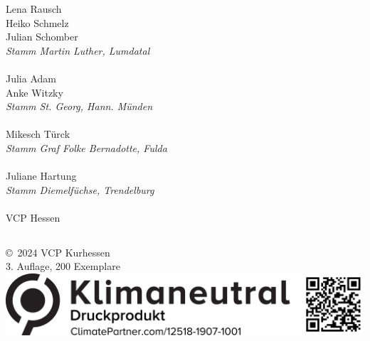 \begin{centering}
\begin{multicols}{2}
Lena Rausch \\ Heiko Schmelz \\ Julian Schomber \\
\textit{Stamm Martin Luther, Lumdatal} \\ ~\\

Julia Adam \\ Anke Witzky \\
\textit{Stamm St. Georg, Hann. Münden}  \\ ~\\

Mikesch Türck \\ \textit{Stamm Graf Folke Bernadotte, Fulda} \\ ~\\

Juliane Hartung \\ \textit{Stamm Diemelfüchse, Trendelburg} \\ ~\\

VCP Hessen

\end{multicols}

\subsection*{}

\vfill
\copyright~2024 VCP Kurhessen \\
3. Auflage, 200 Exemplare
\vfill
\includegraphics[width=.5\textwidth]{Ausgaben/PfadiralalaIV/v2018qr_DE_B_12518-1907-1001-1c}

\end{centering}

